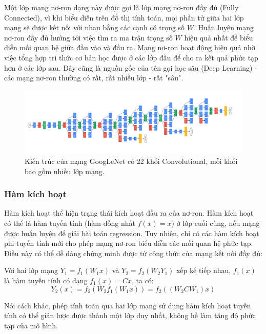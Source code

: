 \documentclass[12pt]{extreport}
\begin{document}
Một lớp mạng nơ-ron dạng này được gọi là lớp mạng nơ-ron đầy đủ (Fully Connected), vì khi biểu diễn trên đồ thị tính toán, mọi phần tử giữa hai lớp mạng sẽ được kết nối với nhau bằng các cạnh có trọng số $ W $. Huấn luyện mạng nơ-ron đầy đủ hướng tới việc tìm ra ma trận trọng số $ W $ hiệu quả nhất để biểu diễn mối quan hệ giữa đầu vào và đầu ra. Mạng nơ-ron hoạt động hiệu quả nhờ việc tổng hợp tri thức cơ bản học được ở các lớp đầu để cho ra kết quả phức tạp hơn ở các lớp sau. Đây cũng là nguồn gốc của tên gọi học sâu (Deep Learning) - các mạng nơ-ron thường có rất, rất nhiều lớp - rất "sâu".

\begin{figure}[H]
    \centering
    \includegraphics[width=\textwidth]{figure5}
    \caption{Kiến trúc của mạng GoogLeNet có 22 khối Convolutional, mỗi khối bao gồm nhiều lớp mạng.}
\end{figure}

\subsubsection{Hàm kích hoạt}

Hàm kích hoạt thể hiện trạng thái kích hoạt đầu ra của nơ-ron. Hàm kích hoạt có thể là hàm tuyến tính (hàm đồng nhất $ f(x) = x $) ở lớp cuối cùng, nếu mạng được huấn luyện để giải bài toán regression. Tuy nhiên, chỉ có các hàm kích hoạt phi tuyến tính mới cho phép mạng nơ-ron biểu diễn các mối quan hệ phức tạp. Điều này có thể dễ dàng chứng minh được từ công thức của mạng kết nối đầy đủ:

Với hai lớp mạng $ Y_1 = f_1(W_1x) $ và $ Y_2 = f_2(W_2Y_1) $ xếp kế tiếp nhau, $ f_1(x) $ là hàm tuyến tính có dạng $ f_1(x) = Cx $, ta có:
$$ Y_2(x) = f_2(W_2f_1(W_1x)) = f_2((W_2CW_1)x) $$

Nói cách khác, phép tính toán qua hai lớp mạng sử dụng hàm kích hoạt tuyến tính có thể giản lược được thành một lớp duy nhất, không hề làm tăng độ phức tạp của mô hình.
\end{document}
